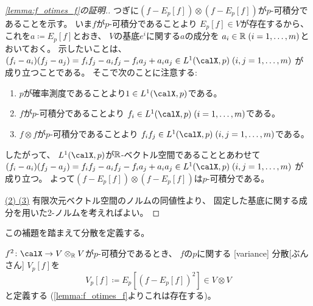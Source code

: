 \documentclass[report]{jlreq}
\begin{document}
\begin{proof}[\cref{lemma:f_otimes_f}の証明.]
    つぎに$(f - E_p[f]) \otimes (f - E_p[f])$が$p$-可積分であることを示す。
    いま$f$が$p$-可積分であることより
    $E_p[f] \in V$が存在するから、
    これを$a \coloneqq E_p[f]$とおき、
    $V$の基底$e^i$に関する$a$の成分を
    $a_i \in \mathbb{R} \; (i = 1, \dots, m)$とおいておく。
    示したいことは、
    $(f_i - a_i)(f_j - a_j)
        = f_i f_j - a_i f_j - f_i a_j + a_i a_j
        \in L^1(\calX, p) \; (i, j = 1, \dots, m)$
    が成り立つことである。
    そこで次のことに注意する:
    \begin{enumerate}[label=(\roman*)]
        \item $p$が確率測度であることより$1 \in L^1(\calX, p)$である。
        \item $f$が$p$-可積分であることより
            $f_i \in L^1(\calX, p) \; (i = 1, \dots, m)$である。
        \item $f \otimes f$が$p$-可積分であることより
            $f_i f_j
                \in L^1(\calX, p) \;
                (i, j = 1, \dots, m)$である。
    \end{enumerate}
    したがって、
    $L^1(\calX, p)$が$\mathbb{R}$-ベクトル空間であることとあわせて
    $(f_i - a_i)(f_j - a_j)
        = f_i f_j - a_i f_j - f_i a_j + a_i a_j
        \in L^1(\calX, p) \; (i, j = 1, \dots, m)$
    が成り立つ。
    よって$(f - E_p[f]) \otimes (f - E_p[f])$は$p$-可積分である。

    \uline{(2) \Leftrightarrow (3)} \quad
    有限次元ベクトル空間のノルムの同値性より、
    固定した基底に関する成分を用いた2-ノルムを考えればよい。
\end{proof}

この補題を踏まえて分散を定義する。

\begin{definition}[分散]
    $f^2 \colon \calX \to V \otimes_\R V$が$p$-可積分であるとき、
    $f$の$p$に関する
    [variance]
        {分散}[ぶんさん]
    $V_p[f]$を
    \begin{equation}
        V_p[f]
            \coloneqq E_p[(f - E_p[f])^2]
            \in V \otimes V
    \end{equation}
    と定義する
    (\cref{lemma:f_otimes_f}よりこれは存在する)。
\end{definition}
\end{document}
